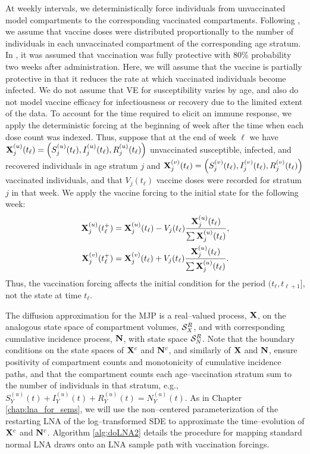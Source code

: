 At weekly intervals, we deterministically force individuals from unvaccinated model compartments to the corresponding vaccinated compartments. Following \cite{shubin2016revealing}, we assume that vaccine doses were distributed proportionally to the number of individuals in each unvaccinated compartment of the corresponding age stratum. In \cite{shubin2016revealing}, it was assumed that vaccination was fully protective with 80\% probability two weeks after administration. Here, we will assume that the vaccine is partially protective in that it reduces the rate at which vaccinated individuals become infected. We do not assume that VE for susceptibility varies by age, and also do not model vaccine efficacy for infectiousness or recovery due to the limited extent of the data. To account for the time required to elicit an immune response, we apply the deterministic forcing at the beginning of week after the time when each dose count was indexed. Thus, suppose that at the end of week $ \ell $ we have $ \mathbf{X}_j^{(u)}(t_\ell) = \left (S_j^{(u)}(t_\ell), I_j^{(u)}(t_\ell), R_j^{(u)}(t_\ell)\right ) $ unvaccinated susceptible, infected, and recovered individuals in age stratum $ j $ and $ \mathbf{X}_j^{(v)}(t_\ell) = \left (S_j^{(v)}(t_\ell), I_j^{(v)}(t_\ell), R_j^{(v)}(t_\ell)\right ) $ vaccinated individuals, and that $ V_j(t_\ell) $ vaccine doses were recorded for stratum $ j $ in that week. We apply the vaccine forcing to the initial state for the following week: 
\begin{align}
\label{eqn:vacc_forcing}
\begin{split}
	\mathbf{X}_{j}^{(u)}(t_\ell^+) &= \mathbf{X}_j^{(u)}(t_\ell) - V_j(t_\ell)\frac{\mathbf{X}_{j}^{(u)}(t_\ell)}{\sum\mathbf{X}_{j}^{(u)}(t_\ell)}, \\
	\mathbf{X}_{j}^{(v)}(t_\ell^+) &= \mathbf{X}_j^{(v)}(t_\ell) + V_j(t_\ell)\frac{\mathbf{X}_{j}^{(u)}(t_\ell)}{\sum\mathbf{X}_{j}^{(u)}(t_\ell)}.
\end{split}
\end{align}
Thus, the vaccination forcing affects the initial condition for the period $ (t_\ell,t_{\ell+1}] $, not the state at time $ t_\ell $. 

The diffusion approximation for the MJP is a real--valued process, $ \mathbf{X} $, on the analogous state space of compartment volumes, $ \mathcal{S}_X^R $, and with corresponding cumulative incidence process, $ \mathbf{N} $, with state space $ \mathcal{S}_N^R $. Note that the boundary conditions on the state spaces of $ \mathbf{X}^c $ and $ \mathbf{N}^c $, and similarly of $ \mathbf{X} $ and $ \mathbf{N} $, ensure positivity of compartment counts and monotonicity of cumulative incidence paths, and that the compartment counts each age--vaccination stratum sum to the number of individuals in that stratum, e.g., $ S_{Y}^{(u)}(t) + I_{Y}^{(u)}(t) + R_{Y}^{(u)}(t) = N_{Y}^{(u)}(t) $. As in Chapter \ref{chap:lna_for_sems}, we will use the non--centered parameterization of the restarting LNA of the log--transformed SDE to approximate the time--evolution of $ \mathbf{X}^c $ and $ \mathbf{N}^c $. Algorithm \ref{alg:doLNA2} details the procedure for mapping standard normal LNA draws onto an LNA sample path with vaccination forcings.

